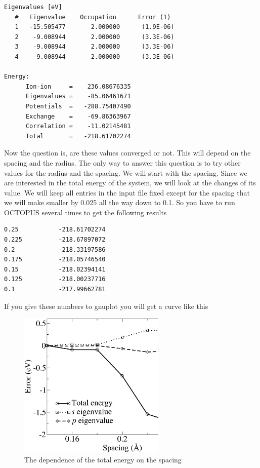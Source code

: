 \documentclass{article}
\begin{document}
\begin{verbatim}
Eigenvalues [eV]
   #   Eigenvalue    Occupation      Error (1)
   1   -15.505477       2.000000      (1.9E-06)
   2    -9.008944       2.000000      (3.3E-06)
   3    -9.008944       2.000000      (3.3E-06)
   4    -9.008944       2.000000      (3.3E-06)

Energy:
      Ion-ion     =    236.08676335
      Eigenvalues =    -85.06461671
      Potentials  =   -288.75407490
      Exchange    =    -69.86363967
      Correlation =    -11.02145481
      Total       =   -218.61702274
\end{verbatim}

Now the question is, are these values converged or not. This will depend on the
spacing and the radius. The only way to answer this question is to try other
values for the radius and the spacing. We will start with the spacing. Since we
are interested in the total energy of the system, we will look at the changes of
its value. We will keep all entries in the input file fixed except for the
spacing that we will make smaller by 0.025 all the way down to 0.1. So you have
to run OCTOPUS several times to get the following results

\begin{verbatim}
0.25           -218.61702274
0.225          -218.67897072
0.2            -218.33197586
0.175          -218.05746540
0.15           -218.02394141
0.125          -218.00237716
0.1            -217.99662781
\end{verbatim}

If you give these numbers to gnuplot you will get a curve like this

\begin{figure}[h]
\begin{center}
\includegraphics[width=7cm,angle=-90]{img/spacing}
\end{center}
\caption{The dependence of the total energy on the spacing}
\end{figure}
\end{document}
